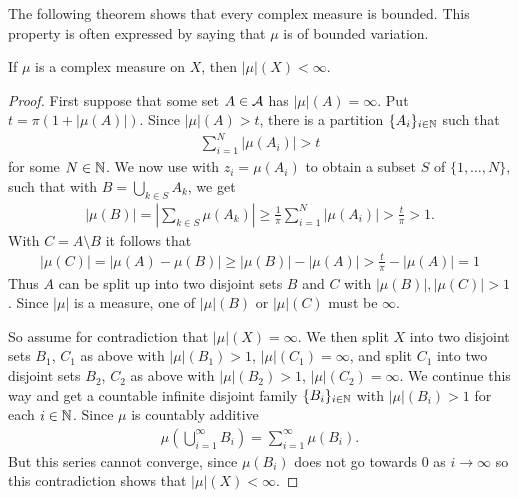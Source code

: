 The following theorem shows that every complex measure is bounded. This property is often expressed by saying that $\mu$ is of bounded variation.

\begin{theorem}\label{thm: total variation is finite}
If $\mu$ is a complex measure on $X$, then $|\mu|(X)<\infty$.
\end{theorem}
\begin{proof}
First suppose that some set $A\in \mathcal{A}$ has $|\mu|(A)=\infty$. Put $t=\pi(1+|\mu(A)|)$. Since $|\mu|(A)>t$, there is a partition $\{A_{i}\}_{i\in \mathbb{N}}$ such that
\begin{align*}
	\sum_{i=1}^{N}|\mu(A_{i})| > t
\end{align*}
for some $N\in \mathbb{N}$. We now use  with $z_{i}=\mu(A_{i})$ to obtain a subset $S$ of $\{1, \dots, N\}$, such that with $B=\bigcup_{k\in S}A_{k}$, we get
\begin{align*}
	|\mu(B)| = \left| \sum_{k\in S} \mu(A_{k}) \right| \ge \frac{1}{\pi} \sum_{i=1}^{N}|\mu(A_{i})| > \frac{t}{\pi} > 1.
\end{align*}
With $C=A\setminus B$ it follows that
\begin{align*}
	|\mu(C)|=|\mu(A)-\mu(B)| \ge |\mu(B)| - |\mu(A)| > \frac{t}{\pi} - |\mu(A)| = 1
\end{align*}
Thus $A$ can be split up into two disjoint sets $B$ and $C$ with $|\mu(B)|, |\mu(C)|>1$. Since $|\mu|$ is a measure, one of $|\mu|(B)$ or $|\mu|(C)$ must be $\infty$.

So assume for contradiction that $|\mu|(X)=\infty$. We then split $X$ into two disjoint sets $B_{1}$, $C_{1}$ as above with $|\mu|(B_{1})>1$, $|\mu|(C_{1})=\infty$, and split $C_{1}$ into two disjoint sets $B_{2}$, $C_{2}$ as above with $|\mu|(B_{2})>1$, $|\mu|(C_{2})=\infty$. We continue this way and get a countable infinite disjoint family $\{B_{i}\}_{i\in \mathbb{N}}$ with $|\mu|(B_{i})>1$ for each $i\in \mathbb{N}$. Since $\mu$ is countably additive
\begin{align*}
	\mu\left( \bigcup_{i=1}^{\infty} B_{i} \right) = \sum_{i=1}^{\infty} \mu(B_{i}).
\end{align*}
But this series cannot converge, since $\mu(B_{i})$ does not go towards $0$ as $i\to \infty$ so this contradiction shows that $|\mu|(X)<\infty$.
\end{proof}

